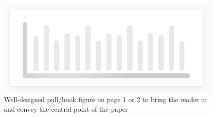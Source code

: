 







\begin{figure}[h]
  \centering
  \begin{minipage}{0.55\linewidth}
      \centering
      \includegraphics[width=\linewidth]{assets/chart_placeholder.png}
  \end{minipage}
\caption{Well-designed pull/hook figure on page 1 or 2 to bring the reader in and convey the central point of the paper}
\label{fig:hook_figure}
\end{figure}

